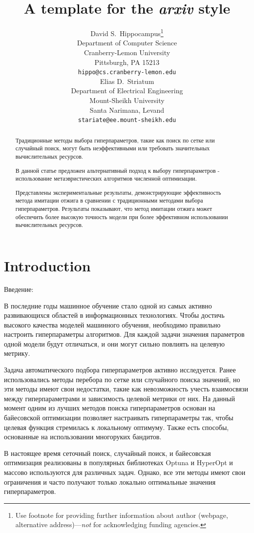 \documentclass{article}
\title{A template for the \emph{arxiv} style}
\author{ David S.~Hippocampus\thanks{Use footnote for providing further
		information about author (webpage, alternative
		address)---\emph{not} for acknowledging funding agencies.} \\
	Department of Computer Science\\
	Cranberry-Lemon University\\
	Pittsburgh, PA 15213 \\
	\texttt{hippo@cs.cranberry-lemon.edu} \\
	\And
	Elias D.~Striatum \\
	Department of Electrical Engineering\\
	Mount-Sheikh University\\
	Santa Narimana, Levand \\
	\texttt{stariate@ee.mount-sheikh.edu} \\
}
\date{}
\begin{document}
\maketitle

\begin{abstract}
Традиционные методы выбора гиперпараметров, такие как поиск по сетке или случайный поиск, могут быть неэффективными или требовать значительных вычислительных ресурсов.

В данной статье предложен альтернативный подход к выбору гиперпараметров - использование метаэвристических алгоритмов численной оптимизации. 

Представлены экспериментальные результаты, демонстрирующие эффективность метода имитации отжига в сравнении с традиционными методами выбора гиперпараметров. Результаты показывают, что метод имитации отжига может обеспечить более высокую точность модели при более эффективном использовании вычислительных ресурсов.
\end{abstract}



\section{Introduction}
Введение:

В последние годы машинное обучение стало одной из самых активно развивающихся областей в информационных технологиях. Чтобы достичь высокого качества моделей машинного обучения, необходимо правильно настроить гиперпараметры алгоритмов. Для каждой задачи значения параметров одной модели будут отличаться, и они могут сильно повлиять на целевую метрику. 

Задача автоматического подбора гиперпараметров активно исследуется. Ранее использовались методы перебора по сетке или случайного поиска значений, но эти методы имеют свои недостатки, такие как невозможность учесть взаимосвязи между гиперпараметрами и зависимость целевой метрики от них. На данный момент одним из лучших методов поиска гиперпараметров основан на байесовской оптимизации позволяет настраивать гиперпараметры так, чтобы целевая функция стремилась к локальному оптимуму. Также есть способы, основанные на использовании многоруких бандитов.

В настоящее время сеточный поиск, случайный поиск, и байесовская оптимизация реализованы в популярных библиотеках Optuna и HyperOpt и массово используются для различных задач.  Однако, все эти методы имеют свои ограничения и часто получают только локально оптимальные значения гиперпараметров.
\end{document}
